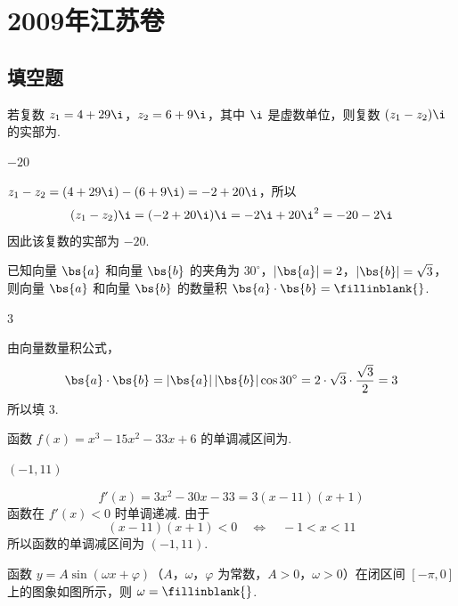 \chapter{2009年江苏卷}

\section{填空题}

\begin{problem}
若复数 \(z_1=4+29\i\)，\(z_2=6+9\i\)，其中 \(\i\) 是虚数单位，则复数 \((z_1-z_2)\i\) 的实部为\fillinblank{}.
\end{problem}

\begin{answer}
\(-20\)
\end{answer}

\begin{solution}
\(z_1-z_2=(4+29\i)-(6+9\i)=-2+20\i\)，所以
\[
(z_1-z_2)\i=(-2+20\i)\i=-2\i+20\i^2=-20-2\i
\]
因此该复数的实部为 \(-20\).
\end{solution}

\begin{problem}
已知向量 \(\bs{a}\) 和向量 \(\bs{b}\) 的夹角为 \(30^\circ\)，\(|\bs{a}|=2\)，\(|\bs{b}|=\sqrt3\)，则向量 \(\bs{a}\) 和向量 \(\bs{b}\) 的数量积 \(\bs{a}\cdot\bs{b}=\fillinblank{}\).
\end{problem}

\begin{answer}
\(3\)
\end{answer}

\begin{solution}
由向量数量积公式，
\[
\bs{a}\cdot\bs{b}=|\bs{a}|\,|\bs{b}|\cos30^\circ
=2\cdot\sqrt3\cdot\frac{\sqrt3}{2}=3
\]
所以填 \(3\).
\end{solution}

\begin{problem}
函数 \(f(x)=x^3-15x^2-33x+6\) 的单调减区间为\fillinblank{}.
\end{problem}

\begin{answer}
\((-1,11)\)
\end{answer}

\begin{solution}
\[
f'(x)=3x^2-30x-33=3(x-11)(x+1)
\]
函数在 \(f'(x)<0\) 时单调递减. 由于
\[
(x-11)(x+1)<0\quad\Longleftrightarrow\quad -1<x<11
\]
所以函数的单调减区间为 \((-1,11)\).
\end{solution}

\begin{problem}
函数 \(y=A\sin(\omega x+\varphi)\)（\(A\)，\(\omega\)，\(\varphi\) 为常数，\(A>0\)，\(\omega>0\)）在闭区间 \([-\pi,0]\) 上的图象如图所示，则 \(\omega=\fillinblank{}\).

\end{problem}

